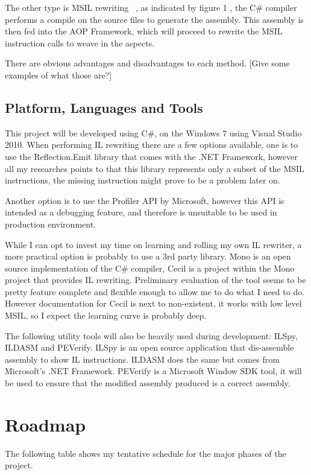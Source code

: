 The other type is MSIL rewriting ~\cite{rewrite_msil}, as indicated by figure 1 , the C\# compiler performs a compile on the source files to generate the assembly. This assembly is then fed into the AOP Framework, which will proceed to rewrite the MSIL instruction calls to weave in the aspects.

There are obvious advantages and disadvantages to each method. [Give some examples of what those are?]

\subsection{Platform, Languages and Tools}
This project will be developed using C\#, on the Windows 7 using Visual Studio 2010. When performing IL rewriting there are a few options available, one is to use the Reflection.Emit library that comes with the .NET Framework, however all my researches points to that this library represents only a subset of the MSIL instructions, the missing instruction might prove to be a problem later on.

Another option is to use the Profiler API by Microsoft, however this API is intended as a debugging feature, and therefore is unsuitable to be used in production environment.

While I can opt to invest my time on learning and rolling my own IL rewriter, a more practical option is probably to use a 3rd party library. Mono is an open source implementation of the C\# compiler, Cecil is a project within the Mono project that provides IL rewriting. Preliminary evaluation of the tool seems to be pretty feature complete and flexible enough to allow me to do what I need to do. However documentation for Cecil is next to non-existent, it works with low level MSIL, so I expect the learning curve is probably deep.

The following utility tools will also be heavily used during development: ILSpy, ILDASM and PEVerify. ILSpy is an open source application that dis-assemble assembly to show IL instructions. ILDASM does the same but comes from Microsoft’s .NET Framework. PEVerify is a Microsoft Window SDK tool, it will be used to ensure that the modified assembly produced is a correct assembly.

\section{Roadmap}
The following table shows my tentative schedule for the major phases of the project.


